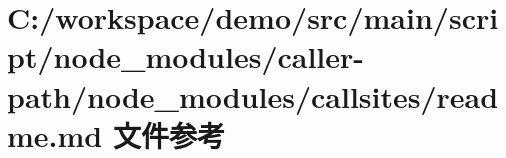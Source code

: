 \hypertarget{node__modules_2caller-path_2node__modules_2callsites_2_r_e_a_d_m_e_8md}{}\section{C\+:/workspace/demo/src/main/script/node\+\_\+modules/caller-\/path/node\+\_\+modules/callsites/readme.md 文件参考}
\label{node__modules_2caller-path_2node__modules_2callsites_2_r_e_a_d_m_e_8md}
